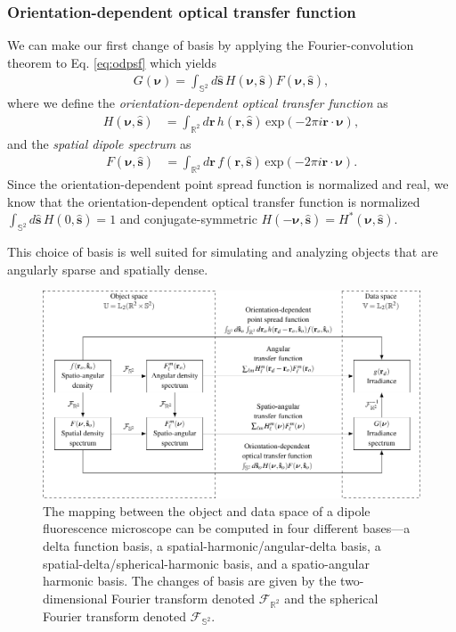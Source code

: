 \documentclass[]{osa-article}
\providecommand{\mb}[1]{\mathbf{#1}}
\providecommand{\mh}[1]{\mathbf{\hat{#1}}}
\providecommand{\mbb}[1]{\mathbb{#1}}
\providecommand{\bs}[1]{\boldsymbol{#1}}
\begin{document}
\subsubsection{Orientation-dependent optical transfer function}
We can make our first change of basis by applying the Fourier-convolution
theorem to Eq. \ref{eq:odpsf} which yields
\begin{align}
G(\bs{\nu}) = \int_{\mbb{S}^2}d\mh{s}\, H(\bs{\nu}, \mh{s})F(\bs{\nu}, \mh{s}) \label{eq:odotf},
\end{align}
where we define the \textit{orientation-dependent optical transfer function} as
  \begin{align}
  H(\bs{\nu}, \mh{s}) &= \int_{\mbb{R}^2}d\mb{r}\, h(\mb{r}, \mh{s})\, \text{exp}(-2\pi i\mb{r}\cdot\bs{\nu}),
  \end{align}
and the \textit{spatial dipole spectrum} as
  \begin{align}
  F(\bs{\nu}, \mh{s}) &= \int_{\mbb{R}^2}d\mb{r}\, f(\mb{r}, \mh{s})\, \text{exp}(-2\pi i\mb{r}\cdot\bs{\nu}). 
  \end{align}
  Since the orientation-dependent point spread function is normalized and real,
  we know that the orientation-dependent optical transfer function is normalized
  $\int_{\mbb{S}^2}d\mh{s}\, H(0, \mh{s}) = 1$ and conjugate-symmetric
  $H(-\bs{\nu}, \mh{s}) = H^*(\bs{\nu}, \mh{s})$.
  
  This choice of basis is well suited for simulating and analyzing objects that
  are angularly sparse and spatially dense.

  \begin{figure}
  \hspace{-5em}
  \includegraphics[scale=1.0]{../figures/dipole-block/dipole-block.pdf}
  \caption{The mapping between the object and data space of a dipole
    fluorescence microscope can be computed in four different bases---a delta
    function basis, a spatial-harmonic/angular-delta basis, a
    spatial-delta/spherical-harmonic basis, and a spatio-angular harmonic basis.
    The changes of basis are given by the two-dimensional Fourier transform
    denoted $\mathcal{F}_{\mbb{R}^2}$ and the spherical Fourier transform
    denoted $\mathcal{F}_{\mbb{S}^2}$.}
   \label{fig:dipole-block}      
    \end{figure}
\end{document}
